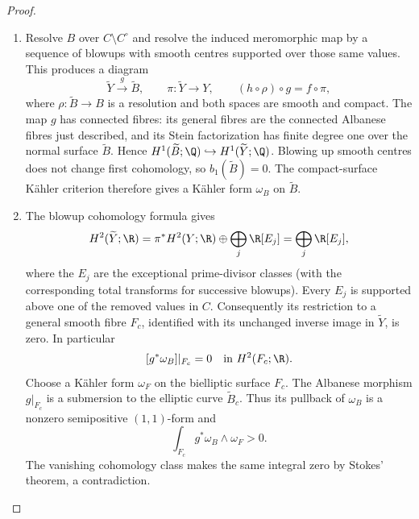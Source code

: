 \begin{proof}
\begin{enumerate}[label=\arabic*.,leftmargin=*]
\item Resolve $B$ over $C\setminus C^\circ$ and resolve the induced
meromorphic map by a sequence of blowups with smooth centres
supported over those same values. This produces a diagram
\[
 \widetilde Y\xrightarrow{\ g\ }\widetilde B,
 \qquad \pi:\widetilde Y\longrightarrow Y,
 \qquad (h\circ\rho)\circ g=f\circ\pi,
\]
where $\rho:\widetilde B\to B$ is a resolution and both spaces
are smooth and compact. The map $g$ has connected fibres:
its general fibres are the connected Albanese fibres just described,
and its Stein factorization has finite degree one over the normal
surface $\widetilde B$. Hence
$H^1(\widetilde B;\Q)\hookrightarrow H^1(\widetilde Y;\Q)$.
Blowing up smooth centres does not change first cohomology, so
$b_1(\widetilde B)=0$. The compact-surface K\"ahler criterion
\cite[Theorem~11, p.~297]{Buchdahl1999} therefore gives a K\"ahler form
$\omega_B$ on $\widetilde B$.

\item The blowup cohomology formula gives
\[
 H^2(\widetilde Y;\R)
 =\pi^*H^2(Y;\R)\oplus\bigoplus_j\R[E_j]
 =\bigoplus_j\R[E_j],
\]
where the $E_j$ are the exceptional prime-divisor classes (with
the corresponding total transforms for successive blowups).
Every $E_j$ is supported above one of the removed values in $C$.
Consequently its restriction to a general smooth fibre $F_c$,
identified with its unchanged inverse image in $\widetilde Y$,
is zero. In particular
\[
 [g^*\omega_B]|_{F_c}=0\quad\hbox{in }H^2(F_c;\R).
\]
Choose a K\"ahler form $\omega_F$ on the bielliptic surface $F_c$.
The Albanese morphism $g|_{F_c}$ is a submersion to the elliptic
curve $\widetilde B_c$. Thus its pullback of $\omega_B$ is a
nonzero semipositive $(1,1)$-form and
\[
 \int_{F_c}g^*\omega_B\wedge\omega_F>0.
\]
The vanishing cohomology class makes the same integral zero by
Stokes' theorem, a contradiction.

\end{enumerate}
\end{proof}